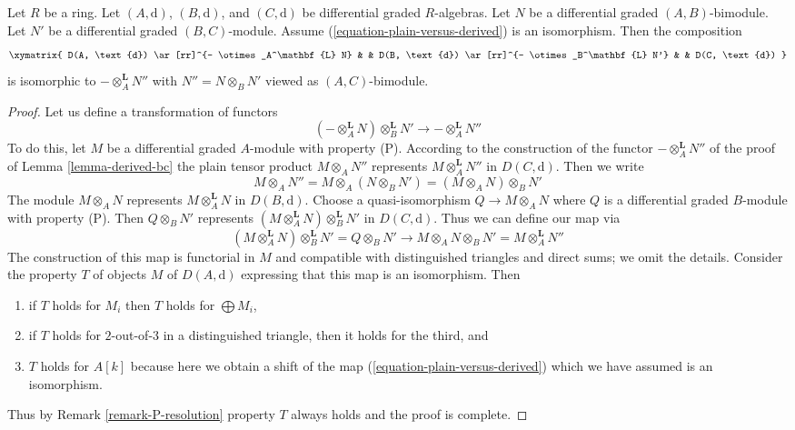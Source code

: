 \begin{lemma}
\label{lemma-compose-tensor-functors-general}
Let $R$ be a ring. Let $(A, \text{d})$, $(B, \text{d})$, and
$(C, \text{d})$ be differential graded $R$-algebras.
Let $N$ be a differential graded $(A, B)$-bimodule.
Let $N'$ be a differential graded $(B, C)$-module.
Assume (\ref{equation-plain-versus-derived}) is an isomorphism.
Then the composition
$$
\xymatrix{
D(A, \text{d}) \ar[rr]^{- \otimes_A^\mathbf{L} N} & &
D(B, \text{d}) \ar[rr]^{- \otimes_B^\mathbf{L} N'} & &
D(C, \text{d})
}
$$
is isomorphic to $- \otimes_A^\mathbf{L} N''$ with
$N'' = N \otimes_B N'$ viewed as $(A, C)$-bimodule.
\end{lemma}

\begin{proof}
Let us define a transformation of functors
$$
(- \otimes_A^\mathbf{L} N) \otimes_B^\mathbf{L} N'
\longrightarrow
- \otimes_A^\mathbf{L} N''
$$
To do this, let
$M$ be a differential graded $A$-module with property (P).
According to the construction of the functor $- \otimes_A^\mathbf{L} N''$
of the proof of Lemma \ref{lemma-derived-bc} the plain tensor
product $M \otimes_A N''$ represents $M \otimes_A^\mathbf{L} N''$
in $D(C, \text{d})$. Then we write
$$
M \otimes_A N'' =
M \otimes_A (N \otimes_B N') =
(M \otimes_A N) \otimes_B N'
$$
The module $M \otimes_A N$ represents $M \otimes_A^\mathbf{L} N$
in $D(B, \text{d})$. Choose a quasi-isomorphism $Q \to M \otimes_A N$
where $Q$ is a differential graded $B$-module with property (P). Then
$Q \otimes_B N'$ represents
$(M \otimes_A^\mathbf{L} N) \otimes_B^\mathbf{L} N'$ in
$D(C, \text{d})$.
Thus we can define our map via
$$
(M \otimes_A^\mathbf{L} N) \otimes_B^\mathbf{L} N' =
Q \otimes_B N' \to
M \otimes_A N \otimes_B N' =
M \otimes_A^\mathbf{L} N''
$$
The construction of this map is functorial in $M$ and compatible
with distinguished triangles and direct sums; we omit the details.
Consider the property $T$ of objects $M$ of $D(A, \text{d})$ 
expressing that this map is an isomorphism. Then
\begin{enumerate}
\item if $T$ holds for $M_i$ then $T$ holds for $\bigoplus M_i$,
\item if $T$ holds for $2$-out-of-$3$ in a distinguished
triangle, then it holds for the third, and
\item $T$ holds for $A[k]$ because here we obtain a shift
of the map (\ref{equation-plain-versus-derived}) which we
have assumed is an isomorphism.
\end{enumerate}
Thus by Remark \ref{remark-P-resolution} property $T$
always holds and the proof is complete.
\end{proof}

